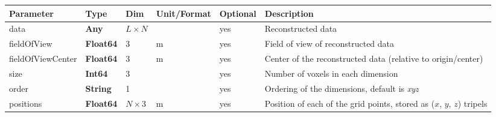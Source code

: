 \documentclass[landscape]{article} %
\newcommand{\inltab}[1]{{\ttfamily\bfseries\color{blue}#1}}
\newcommand{\inlvar}[1]{{\ttfamily#1}}
\begin{document}
\noindent \begin{tabularx}{\columnwidth}{lllllX} 
\textbf{Parameter} & \textbf{Type} & \textbf{Dim} & \textbf{Unit/Format} & \textbf{Optional} & \textbf{Description} \\ \hline 
\inlvar{data} & \inltab{Any} & $L\times N$ & & yes & Reconstructed data \\ \hline
\inlvar{fieldOfView} & \inltab{Float64} & $3$ & m & yes & Field of view of reconstructed data \\ \hline
\inlvar{fieldOfViewCenter} & \inltab{Float64} & $3$ & m & yes & Center of the reconstructed data (relative to origin/center) \\ \hline 
\inlvar{size} & \inltab{Int64} & $3$ &  & yes & Number of voxels in each dimension \\ \hline
\inlvar{order} & \inltab{String} & 1 & & yes & Ordering of the dimensions, default is \textit{xyz} \\ \hline
\inlvar{positions} & \inltab{Float64} & $N \times 3$ & m & yes & Position of each of the grid points, stored as ($x$, $y$, $z$) tripels \\ \hline
\end{tabularx}

%

%
\end{document}
